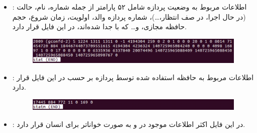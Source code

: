 \begin{enumerate}
\begin{itemize}
  		 \item \textbf{}:
  		   اطلاعات مربوط به وضعیت پردازه شامل ۵۲ پارامتر از جمله شماره، نام، حالت (در حال اجرا، در صف انتظار،…)، شماره پردازه والد، اولویت، زمان شروع، حجم حافظه مجازی، و… که با  جدا شده‌اند، در این فایل قرار دارد.
  		   
  		   \begin{figure}[h!]
  		   	\centering
  		   	\includegraphics[scale=.4]{img/stat.png}
  		   \end{figure}
  		   
  		   \item \textbf{}:
  		    اطلاعات مربوط به حافظه استفاده شده توسط پردازه بر حسب  در این فایل قرار دارد.
  		      		   \begin{figure}[hbpt!]
  		    	\centering
  		    	\includegraphics[scale=.4]{img/statm.png}
  		    \end{figure}
  		    \item \textbf{}:
  		     در این فایل اکثر اطلاعات موجود در  و  به صورت خواناتر برای انسان قرار دارد.
  		     

\end{itemize}
\end{enumerate}
